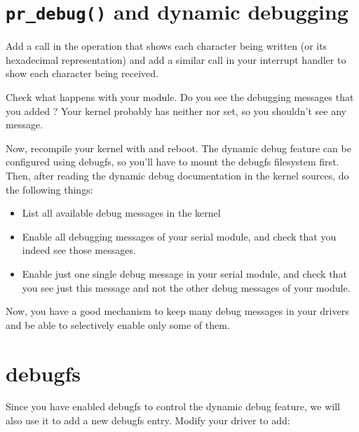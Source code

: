 
\section{{\tt pr\_debug()} and dynamic debugging}

Add a  call in the  operation that shows
each character being written (or its hexadecimal representation) and
add a similar  call in your interrupt handler to show
each character being received.

Check what happens with your module. Do you see the debugging messages
that you added ? Your kernel probably has neither  nor
 set, so you shouldn't see any message.

Now, recompile your kernel with  and reboot. The
dynamic debug feature can be configured using debugfs, so you'll have
to mount the debugfs filesystem first. Then, after reading the dynamic
debug documentation in the kernel sources, do the following things:

\begin{itemize}

\item List all available debug messages in the kernel

\item Enable all debugging messages of your serial module, and check
  that you indeed see those messages.

\item Enable just one single debug message in your serial module, and
  check that you see just this message and not the other debug
  messages of your module.

\end{itemize}

Now, you have a good mechanism to keep many debug messages in your
drivers and be able to selectively enable only some of them.

\section{debugfs}

Since you have enabled debugfs to control the dynamic debug feature,
we will also use it to add a new debugfs entry. Modify your driver to
add:

